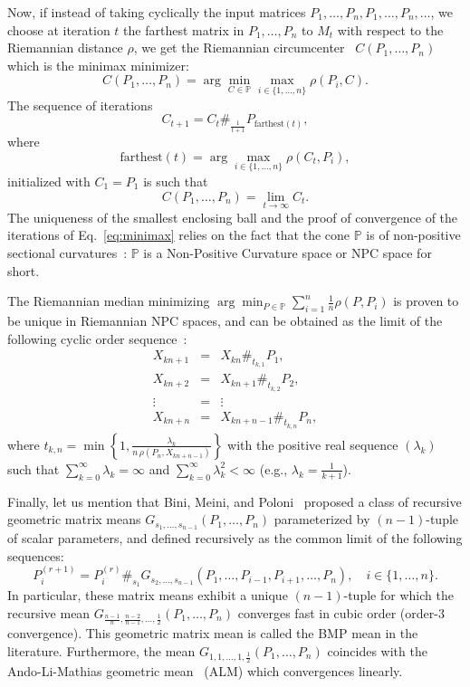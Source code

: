 \documentclass{article}
\def\farthest{\mathrm{farthest}}
\def\bbP{\mathbb{P}}
\begin{document}
 
Now, if instead of taking cyclically the input matrices $P_1,\ldots, P_n, P_1,\ldots,P_n,\ldots$, we choose at iteration $t$ the farthest matrix in $P_1,\ldots, P_n$ to $M_t$ with respect to the Riemannian distance $\rho$, we get the Riemannian circumcenter~\cite{arnaudon2013approximating} $C(P_1,\ldots,P_n)$ which is the minimax minimizer: 
$$
C(P_1,\ldots,P_n)=\arg\min_{C\in\bbP} \max_{i\in\{1,\ldots,n\}} \rho(P_i,C).
$$
The sequence of iterations  
\begin{equation}\label{eq:minimax}
C_{t+1}=C_t \#_{\frac{1}{t+1}} P_{\farthest(t)},
\end{equation}
where
$$
\farthest(t)=\arg\max_{i\in\{1,\ldots,n\}} \rho(C_t,P_i),
$$
 initialized with $C_1=P_1$ is such that
$$
C(P_1,\ldots,P_n)=\lim_{t\rightarrow\infty} C_t.
$$
The uniqueness of the smallest enclosing ball and the proof of convergence of the iterations of Eq.~\ref{eq:minimax}  relies on the fact that the cone $\bbP$ is of non-positive sectional curvatures~\cite{arnaudon2013approximating}:
$\bbP$ is a Non-Positive Curvature space or NPC space for short.


The Riemannian median minimizing $\arg\min_{P\in\bbP} \sum_{i=1}^n \frac{1}{n}\rho(P,P_i)$
is proven to be unique in Riemannian NPC spaces, and can be obtained as the limit of the following cyclic order sequence~\cite{bacak2014computing}:
\begin{eqnarray*}
X_{kn+1} &=& X_{kn}\#_{t_{k,1}} P_1,\\
X_{kn+2} &=& X_{kn+1}\#_{t_{k,2}} P_2,\\
\vdots &=& \vdots \\
X_{kn+n} &=& X_{kn+n-1}\#_{t_{k,n}} P_n,
\end{eqnarray*}
where $t_{k,n}=\min\left\{1,\frac{\lambda_k}{n\, \rho(P_n,X_{kn+n-1})}\right\}$ with the positive real sequence $(\lambda_k)$ such that $\sum_{k=0}^\infty \lambda_k=\infty$ and $\sum_{k=0}^\infty \lambda_k^2<\infty$ (e.g., $\lambda_k=\frac{1}{k+1}$).

Finally, let us mention that 
Bini, Meini, and Poloni~\cite{bini2010effective} proposed a class of recursive geometric matrix means 
$G_{s_1,\ldots, s_{n-1}}(P_1,\ldots, P_n)$ parameterized by $(n-1)$-tuple of scalar parameters, and defined recursively as the common limit of the following sequences:
$$
P_i^{(r+1)}= P_i^{(r)}\#_{s_1} G_{s_2,\ldots, s_{n-1}}\left(P_1,\ldots,P_{i-1},P_{i+1},\ldots,P_n\right),\quad i\in\{1,\ldots, n\}.
$$
In particular, these matrix means exhibit a unique $(n-1)$-tuple for which the recursive mean 
$G_{\frac{n-1}{n},\frac{n-2}{n-1},\ldots,\frac{1}{2}}(P_1,\ldots, P_n)$ converges fast in cubic order (order-$3$ convergence). 
This geometric matrix mean is called the BMP mean in the literature. 
Furthermore, the mean $G_{1,1,\ldots,1,\frac{1}{2}}(P_1,\ldots, P_n)$ coincides  with the Ando-Li-Mathias geometric mean~\cite{ALM-2004} (ALM) which convergences linearly.
\end{document}
